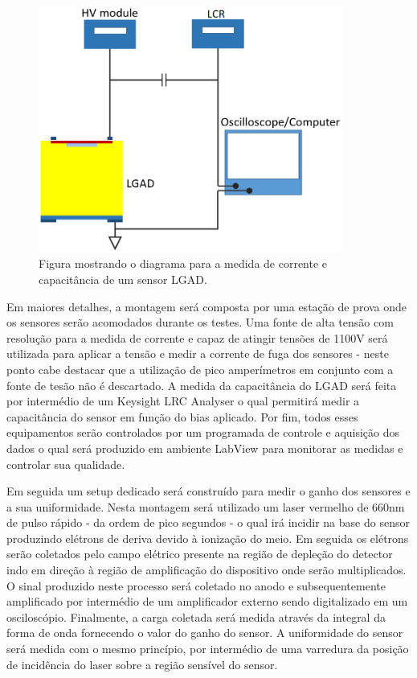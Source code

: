 \begin{figure}
    \centering
    \includegraphics[width=10.0cm]{assets/iv_cv.png}
    \caption{Figura mostrando o diagrama para a medida de corrente e capacitância de um sensor LGAD.}
    \label{setup1}
\end{figure}

Em maiores detalhes, a montagem será composta por uma estação de prova onde os sensores serão acomodados durante os testes. Uma fonte de alta tensão com resolução para a medida de corrente e capaz de atingir tensões de 1100V será utilizada para aplicar a tensão e medir a corrente de fuga dos sensores - neste ponto cabe destacar que a utilização de pico amperímetros em conjunto com a fonte de tesão não é descartado. A medida da capacitância do LGAD será feita por intermédio de um Keysight LRC Analyser o qual permitirá medir a capacitância do sensor em função do bias aplicado. Por fim, todos esses equipamentos serão controlados por um programada de controle e aquisição dos dados o qual será produzido em ambiente LabView para monitorar as medidas e controlar sua qualidade.

Em seguida um setup dedicado será construído para medir o ganho dos sensores e a sua uniformidade. Nesta montagem será utilizado um laser vermelho de 660nm de pulso rápido - da ordem de pico segundos - o qual irá incidir na base do sensor produzindo elétrons de deriva devido à ionização do meio. Em seguida os elétrons serão coletados pelo campo elétrico presente na região de depleção do detector indo em direção à região de amplificação do dispositivo onde serão multiplicados. O sinal produzido neste processo será coletado no anodo e subsequentemente amplificado por intermédio de um amplificador externo sendo digitalizado em um osciloscópio. Finalmente, a carga coletada será medida através da integral da forma de onda fornecendo o valor do ganho do sensor. A uniformidade do sensor será medida com o mesmo princípio, por intermédio de uma varredura da posição de incidência do laser sobre a região sensível do sensor.

